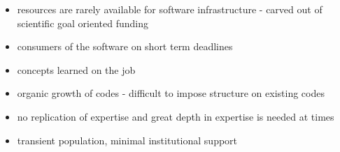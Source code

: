 \begin{itemize}
\item resources are rarely available for software infrastructure - carved out of scientific goal oriented funding
\item consumers of the software on short term deadlines
\item concepts learned on the job
\item organic growth of codes - difficult to impose structure on existing codes
\item no replication of expertise and great depth in expertise is
  needed at times
\item transient population, minimal institutional support
\end{itemize}